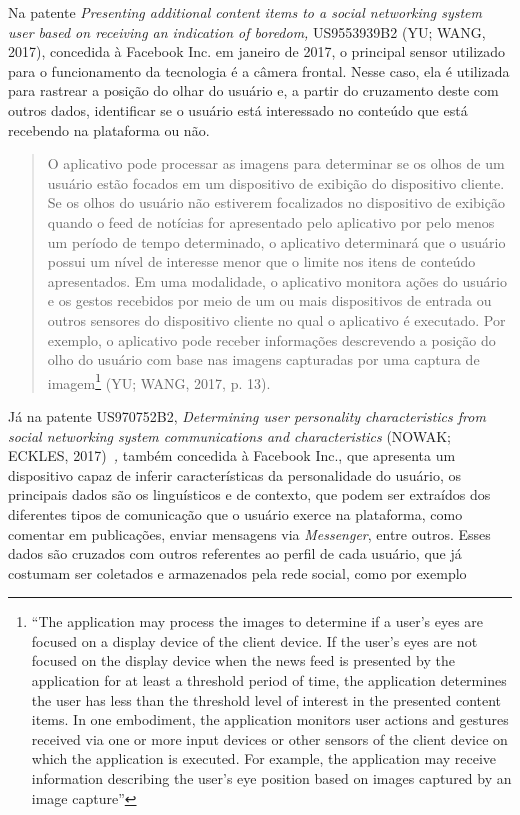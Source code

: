 Na patente \emph{Presenting additional content items to a social
networking system user based on receiving an indication of boredom,}
US9553939B2 (YU; WANG, 2017), concedida à Facebook Inc. em janeiro de
2017, o principal sensor utilizado para o funcionamento da tecnologia é
a câmera frontal. Nesse caso, ela é utilizada para rastrear a posição do
olhar do usuário e, a partir do cruzamento deste com outros dados,
identificar se o usuário está interessado no conteúdo que está recebendo
na plataforma ou não.

\begin{quote}
O aplicativo pode processar as imagens para determinar se os olhos de um
usuário estão focados em um dispositivo de exibição do dispositivo
cliente. Se os olhos do usuário não estiverem focalizados no dispositivo
de exibição quando o feed de notícias for apresentado pelo aplicativo
por pelo menos um período de tempo determinado, o aplicativo determinará
que o usuário possui um nível de interesse menor que o limite nos itens
de conteúdo apresentados. Em uma modalidade, o aplicativo monitora ações
do usuário e os gestos recebidos por meio de um ou mais dispositivos de
entrada ou outros sensores do dispositivo cliente no qual o aplicativo é
executado. Por exemplo, o aplicativo pode receber informações
descrevendo a posição do olho do usuário com base nas imagens capturadas
por uma captura de imagem\footnote{``The application may process the
  images to determine if a user's eyes are focused on a display device
  of the client device. If the user's eyes are not focused on the
  display device when the news feed is presented by the application for
  at least a threshold period of time, the application determines the
  user has less than the threshold level of interest in the presented
  content items. In one embodiment, the application monitors user
  actions and gestures received via one or more input devices or other
  sensors of the client device on which the application is executed. For
  example, the application may receive information describing the user's
  eye position based on images captured by an image capture''} (YU;
WANG, 2017, p. 13).
\end{quote}

Já na patente US970752B2, \emph{Determining user personality
characteristics from social networking system communications and
characteristics} (NOWAK; ECKLES, 2017)\emph{~,} também concedida à
Facebook Inc., que apresenta um dispositivo capaz de inferir
características da personalidade do usuário, os principais dados são os
linguísticos e de contexto, que podem ser extraídos dos diferentes tipos
de comunicação que o usuário exerce na plataforma, como comentar em
publicações, enviar mensagens via \emph{Messenger}, entre outros. Esses
dados são cruzados com outros referentes ao perfil de cada usuário, que
já costumam ser coletados e armazenados pela rede social, como por
exemplo

